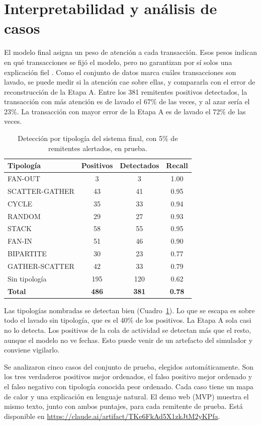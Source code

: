 \documentclass[11pt]{article}
\begin{document}
\section{Interpretabilidad y análisis de casos}

El modelo final asigna un peso de atención a cada transacción. Esos pesos indican en qué transacciones se fijó el modelo, pero no garantizan por sí solos una explicación fiel \cite{jain2019}. Como el conjunto de datos marca cuáles transacciones son lavado, se puede medir si la atención cae sobre ellas, y compararla con el error de reconstrucción de la Etapa A. Entre los 381 remitentes positivos detectados, la transacción con más atención es de lavado el 67\% de las veces, y al azar sería el 23\%. La transacción con mayor error de la Etapa A es de lavado el 72\% de las veces.

\begin{table}[H]
\centering
\begin{tabular}{lccc}
\toprule
Tipología & Positivos & Detectados & Recall \\
\midrule
FAN-OUT & 3 & 3 & 1.00 \\
SCATTER-GATHER & 43 & 41 & 0.95 \\
CYCLE & 35 & 33 & 0.94 \\
RANDOM & 29 & 27 & 0.93 \\
STACK & 58 & 55 & 0.95 \\
FAN-IN & 51 & 46 & 0.90 \\
BIPARTITE & 30 & 23 & 0.77 \\
GATHER-SCATTER & 42 & 33 & 0.79 \\
Sin tipología & 195 & 120 & 0.62 \\
\midrule
\textbf{Total} & \textbf{486} & \textbf{381} & \textbf{0.78} \\
\bottomrule
\end{tabular}
\caption{Detección por tipología del sistema final, con 5\% de remitentes alertados, en prueba.}
\label{tab:tipologias}
\end{table}

Las tipologías nombradas se detectan bien (Cuadro~\ref{tab:tipologias}). Lo que se escapa es sobre todo el lavado sin tipología, que es el 40\% de los positivos. La Etapa A sola casi no lo detecta. Los positivos de la cola de actividad se detectan más que el resto, aunque el modelo no ve fechas. Esto puede venir de un artefacto del simulador y conviene vigilarlo.

Se analizaron cinco casos del conjunto de prueba, elegidos automáticamente. Son los tres verdaderos positivos mejor ordenados, el falso positivo mejor ordenado y el falso negativo con tipología conocida peor ordenado. Cada caso tiene un mapa de calor y una explicación en lenguaje natural. El demo web (MVP) muestra el mismo texto, junto con ambos puntajes, para cada remitente de prueba. Está disponible en \url{https://claude.ai/artifact/TKe6FkAd5X1zkJtM2yKPfa}.
\end{document}
